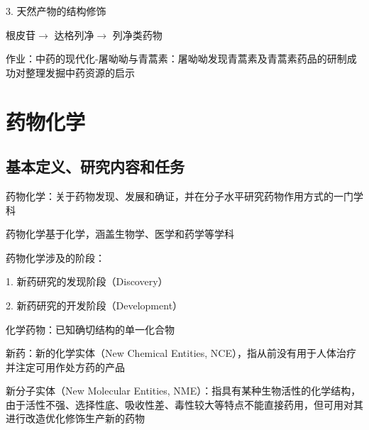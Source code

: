 3. 天然产物的结构修饰
\begin{eg}
    根皮苷$\to $ 达格列净$\to $ 列净类药物
\end{eg}
作业：中药的现代化-屠呦呦与青蒿素：屠呦呦发现青蒿素及青蒿素药品的研制成功对整理发掘中药资源的启示

\section{药物化学}%
\label{sec:药物化学}
\subsection{基本定义、研究内容和任务}%
\label{sub:基本定义、研究内容和任务}
\begin{defi}
    药物化学：关于药物发现、发展和确证，并在分子水平研究药物作用方式的一门学科

    药物化学基于化学，涵盖生物学、医学和药学等学科
\end{defi}
药物化学涉及的阶段：

1. 新药研究的发现阶段（Discovery）

2. 新药研究的开发阶段（Development）
\begin{defi}
    化学药物：已知确切结构的单一化合物

    新药：新的化学实体（New Chemical Entities, NCE），指从前没有用于人体治疗并注定可用作处方药的产品

    新分子实体（New Molecular Entities, NME）：指具有某种生物活性的化学结构，由于活性不强、选择性底、吸收性差、毒性较大等特点不能直接药用，但可用对其进行改造优化修饰生产新的药物
\end{defi}

